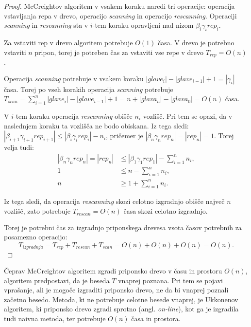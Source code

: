 \begin{proof}
    McCreightov algoritem v vsakem koraku naredi tri operacije: operacija vstavljanja repa v drevo, operacijo \textit{scanning} in operacijo \textit{rescanning}. Operaciji  \textit{scanning} in \textit{rescanning} sta v $i$-tem koraku opravljeni nad nizom $\beta_i\gamma_i\textit{rep}_{i}$. 
    
    Za vstaviti rep v drevo algoritem potrebuje $O(1)$ časa. V drevo je potrebno vstaviti $n$ pripon, torej je potreben čas za vstaviti vse repe v drevo $T_{\textit{rep}}=O(n)$.

    Operacija \textit{scanning} potrebuje v vsakem koraku $|glave_i|-|glave_{i-1}|+1=|\gamma_i|$ časa. Torej po vseh korakih operacija \textit{scanning}  potrebuje $T_{\textit{scan}}=\sum_{i=1}^n |glave_i|-|glave_{i-1}|+1= n + |glava_n|-|glava_0|=O(n)$ časa.

    V $i$-tem koraku operacija \textit{rescanning} obišče $n_i$ vozlišč. Pri tem se opazi, da v naslednjem koraku ta vozlišča ne bodo obiskana. Iz tega sledi:  $|\beta_{i+1}\gamma_{i+1}\textit{rep}_{i+1}|\le|\beta_i\gamma_i\textit{rep}_{i}|-n_i$, pričemer je $|\beta_n\gamma_n\textit{rep}_{n}|=|\textit{rep}_{n}|=1$. Torej velja tudi:    
    \begin{equation*} 
        \begin{split}
        |\beta_n\gamma_n\textit{rep}_{n}|=|\textit{rep}_{n}|&\le|\beta_1\gamma_1\textit{rep}_{1}|- \sum_{i=1}^n n_i,\\
        1&\le n- \sum_{i=1}^n n_i,\\
        n&\ge 1+ \sum_{i=1}^n n_i.
        \end{split}
    \end{equation*}
    
    Iz tega sledi, da operacija \textit{rescanning} skozi celotno izgradnjo obišče največ $n$ vozlišč, zato potrebuje $T_{\textit{rescan}}=O(n)$ časa skozi celotno izgradnjo.
    
    Torej je potrebni čas za izgradnjo priponskega drevesa vsota časov potrebnih za posamezno operacijo: 
    $$T_{\textit{izgradnja}}=T_{\textit{rep}}+T_{\textit{rescan}}+T_{\textit{scan}}=O(n)+O(n)+O(n)=O(n).$$
\end{proof}

Čeprav McCreightov algoritem zgradi priponsko drevo v času in prostoru $O(n)$, algoritem predpostavi, da je beseda $T$ vnaprej poznana. Pri tem se pojavi vprašanje, ali je mogoče izgraditi priponsko drevo, ne da bi vnaprej poznali začetno besedo. Metoda, ki ne potrebuje celotne besede vnaprej, je Ukkonenov algoritem, ki priponsko drevo zgradi sprotno (angl. \textit{on-line}), kot ga je izgradila tudi naivna metoda, ter potrebuje $O(n)$ časa in prostora.

